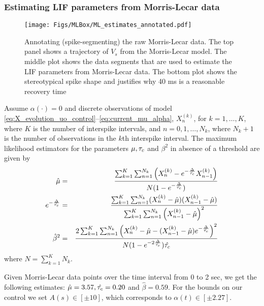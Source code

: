 \subsubsection{Estimating LIF parameters from Morris-Lecar data }
\label{sec:estimaing_LIF_from_ML}


\begin{figure}
\begin{center}
  \texttt{[image: Figs/MLBox/ML\_estimates\_annotated.pdf]} 
  \caption[Spike-annotation for Morrir-Lecar model trajectory]{Annotating
  (spike-segmenting) the raw Morris-Lecar data. The top panel shows a trajectory of $V_s$ from the Morris-Lecar model. 
  The middle plot shows the data segments that are used to estimate the LIF
  parameters from Morris-Lecar data. 
  The bottom plot shows the stereotypical spike shape and justifies why 40 ms
  is a reasonable recovery time}
  \label{fig:ML_estimates_data} 
\end{center}
\end{figure} 
Assume $\alpha(\cdot)=0$ and discrete observations of model \eqref{eq:X_evolution_uo_control}--\eqref{eq:current_mu_alpha}, $X_n^{(k)}$, for $k=1,\ldots ,
K$, where $K$ is the number of interspike intervals, and $n=0,1, \ldots
, N_k$, where $N_k+1$ is the number of observations in the $k$th
interspike interval. 
The maximum likelihood estimators for the parameters $\mu, \tau_c$ and
$\beta^2$ in absence of a threshold are given by 
\begin{eqnarray*} 
\hat{ \mu} &=& 
\frac{ \sum_{k=1}^K \sum_{n=1}^{N_k} \left( X^{(k)}_n - e^{-\frac{\Delta} {\hat {\tau_c}}} X^{(k)}_{n-1} \right)} 
	 { N( 1-e^{-\frac {\Delta} {\hat {\tau_c}}})}
\\
e^{-\frac {\Delta}{\hat{\tau_c}} } &=& 
\frac { \sum_{k=1}^K \sum_{n=1}^{N_k} ( X^{(k)}_n - \hat \mu)(X^{(k)}_{n-1} - \hat \mu) }
						  { \sum_{k=1}^K \sum_{n=1}^{N_k} \left( X^{(k)}_{n-1} - \hat \mu \right)^2 } 
\\
\hat\beta^2 &=&  
\frac{ 2\sum_{k=1}^K \sum_{n=1}^{N_k}  \left( X^{(k)}_n - \hat \mu - (X^{(k)}_{n-1} -
\hat \mu) e^{-\frac {\Delta} {\hat {\tau_c}}} \right)^2 } 
	  { N (1-e^{-2\frac {\Delta} {\hat {\tau_c}}}) \hat {\tau_c}}
\end{eqnarray*}
where $N= \sum_{k=1}^K N_k$.

Given Morris-Lecar data points over the time interval from 0 to 2 sec, we get
the following estimates: $\hat \mu = 3.57, \hat {\tau_c} = 0.20$ and $\hat \beta = 0.59$. For the bounds on our 
control we set $A(s) \in [\pm 10]$, which corresponds to $\alpha(t)
\in [\pm 2.27]$.

